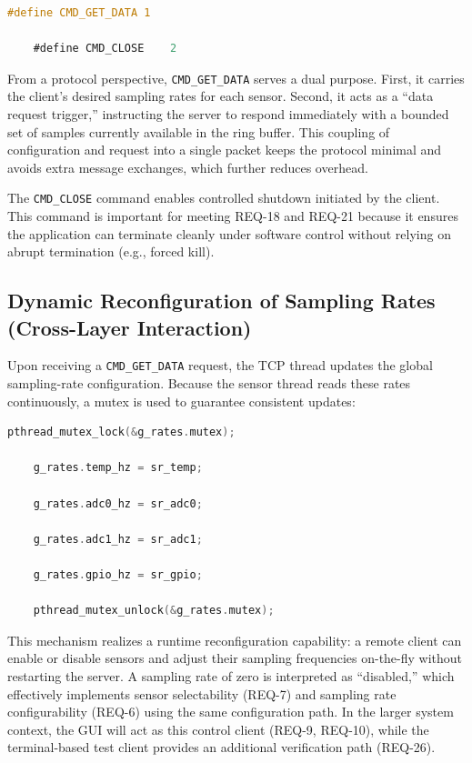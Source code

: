 \begin{lstlisting}[language=C]
	#define CMD_GET_DATA 1
	
	#define CMD_CLOSE    2
\end{lstlisting}

From a protocol perspective, \texttt{CMD\_GET\_DATA} serves a dual purpose. First, it carries the client’s desired sampling rates for each sensor. Second, it acts as a “data request trigger,” instructing the server to respond immediately with a bounded set of samples currently available in the ring buffer. This coupling of configuration and request into a single packet keeps the protocol minimal and avoids extra message exchanges, which further reduces overhead.

The \texttt{CMD\_CLOSE} command enables controlled shutdown initiated by the client. This command is important for meeting REQ-18 and REQ-21 because it ensures the application can terminate cleanly under software control without relying on abrupt termination (e.g., forced kill).

\subsection{Dynamic Reconfiguration of Sampling Rates (Cross-Layer Interaction)}

Upon receiving a \texttt{CMD\_GET\_DATA} request, the TCP thread updates the global sampling-rate configuration. Because the sensor thread reads these rates continuously, a mutex is used to guarantee consistent updates:

\begin{lstlisting}[language=C]
	pthread_mutex_lock(&g_rates.mutex);
	
	g_rates.temp_hz = sr_temp;
	
	g_rates.adc0_hz = sr_adc0;
	
	g_rates.adc1_hz = sr_adc1;
	
	g_rates.gpio_hz = sr_gpio;
	
	pthread_mutex_unlock(&g_rates.mutex);
\end{lstlisting}

This mechanism realizes a runtime reconfiguration capability: a remote client can enable or disable sensors and adjust their sampling frequencies on-the-fly without restarting the server. A sampling rate of zero is interpreted as ``disabled,'' which effectively implements sensor selectability (REQ-7) and sampling rate configurability (REQ-6) using the same configuration path. In the larger system context, the GUI will act as this control client (REQ-9, REQ-10), while the terminal-based test client provides an additional verification path (REQ-26).

